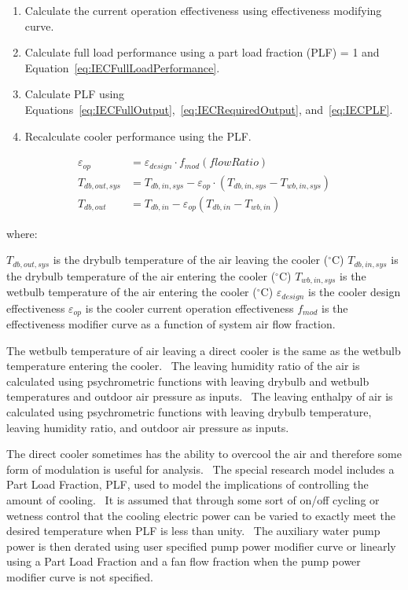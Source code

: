 \begin{enumerate}
\item Calculate the current operation effectiveness using effectiveness modifying curve.
\item Calculate full load performance using a part load fraction (PLF) = 1 and Equation~\ref{eq:IECFullLoadPerformance}.
\item Calculate PLF using Equations~\ref{eq:IECFullOutput},~\ref{eq:IECRequiredOutput}, and~\ref{eq:IECPLF}.
\item Recalculate cooler performance using the PLF.
\end{enumerate}


\begin{equation}
 \begin{array}{rl}
  \varepsilon_{op} & = \varepsilon_{design}\cdot f_{mod}\left(flowRatio\right) \\
  T_{db,out,sys} & = T_{db,in,sys} - \varepsilon_{op}\cdot\left(T_{db,in,sys}-T_{wb,in,sys}\right) \\
  T_{db,out} & = T_{db,in}-\varepsilon_{op}\left(T_{db,in}-T_{wb,in}\right)
 \end{array}
\label{eq:IECFullLoadPerformance}
\end{equation}

where:

\({T_{db,out,sys}}\) is the drybulb temperature of the air leaving the cooler (\(^{\circ}\)C)
\({T_{db,in,sys}}\) is the drybulb temperature of the air entering the cooler (\(^{\circ}\)C)
\({T_{wb,in,sys}}\) is the wetbulb temperature of the air entering the cooler (\(^{\circ}\)C)
\(\varepsilon_{design}\) is the cooler design effectiveness
\(\varepsilon_{op}\) is the cooler current operation effectiveness
\(f_{mod}\) is the effectiveness modifier curve as a function of system air flow fraction.

The wetbulb temperature of air leaving a direct cooler is the same as the wetbulb temperature entering the cooler.~ The leaving humidity ratio of the air is calculated using psychrometric functions with leaving drybulb and wetbulb temperatures and outdoor air pressure as inputs.~ The leaving enthalpy of air is calculated using psychrometric functions with leaving drybulb temperature, leaving humidity ratio, and outdoor air pressure as inputs.

The direct cooler sometimes has the ability to overcool the air and therefore some form of modulation is useful for analysis.~ The special research model includes a Part Load Fraction, PLF, used to model the implications of controlling the amount of cooling.~ It is assumed that through some sort of on/off cycling or wetness control that the cooling electric power can be varied to exactly meet the desired temperature when PLF is less than unity.~ The auxiliary water pump power is then derated using user specified pump power modifier curve or linearly using a Part Load Fraction and a fan flow fraction when the pump power modifier curve is not specified.

